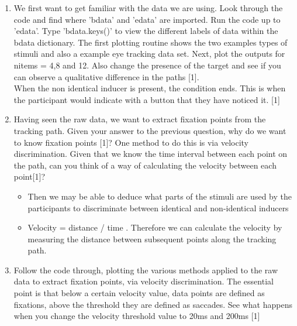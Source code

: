 \documentclass[12pt,english]{scrartcl}
\begin{document}
\begin{enumerate}
\item We first want to get familiar with the data we are using. Look through the code and find where 'bdata' and 'edata' are imported. Run the code up to 'edata'. Type 'bdata.keys()' to view the different labels of data within the bdata dictionary. The first plotting routine shows the two examples types of stimuli and also a example eye tracking data set. Next, plot the outputs for nitems = 4,8 and 12. Also change the presence of the target and see if you can observe a qualitative difference in the paths [1]. \\

 \color{blue}
 When the non identical inducer is present, the condition ends. This is when the participant would indicate with a button that they have noticed it. [1] 
 
 \color{black}
 \item Having seen the raw data, we want to extract fixation points from the tracking path. Given your answer to the previous question, why do we want to know fixation points [1]? One method to do this is via velocity discrimination. Given that we know the time interval between each point on the path, can you think of a way of calculating the velocity between each point[1]? \\
 
 \color{blue}
 \begin{itemize}
  \item Then we may be able to deduce what parts of the stimuli are used by the participants to discriminate between identical and non-identical inducers \\
 
  \item Velocity = distance / time . Therefore we can calculate the velocity by measuring the distance between subsequent points along the tracking path. \\
 
 \end{itemize}

 \color{black}
 \item Follow the code through, plotting the various methods applied to the raw data to extract fixation points, via velocity discrimination. The essential point is that below a certain velocity value, data points are defined as fixations, above the threshold they are defined as saccades. See what happens when you change the velocity threshold value to 20ms and 200ms [1]\\
 

\end{enumerate}
\end{document}

